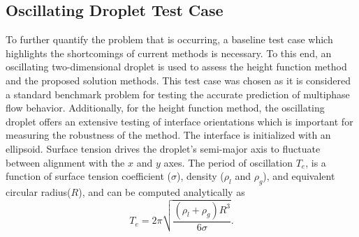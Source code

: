 %

%
%
%

\subsection{Oscillating Droplet Test Case}
To further quantify the problem that is occurring, a baseline test case which highlights the shortcomings of current methods is necessary. To this end, an oscillating two-dimensional droplet is used to assess the height function method and the proposed solution methods. This test case was chosen as it is considered a standard benchmark problem for testing the accurate prediction of multiphase flow behavior\cite{Salih2002}. Additionally, for the height function method, the oscillating droplet offers an extensive testing of interface orientations which is important for measuring the robustness of the method. The interface is initialized with an ellipsoid. Surface tension drives the droplet's semi-major axis to fluctuate between alignment with the $x$ and $y$ axes. The period of oscillation $T_{e}$, is a function of surface tension coefficient ($\sigma$), density ($\rho_l$ and $\rho_g$), and equivalent circular radius($R$), and can be computed analytically as~\cite{Rayleigh}
\begin{equation}
T_{e} = 2 \pi \sqrt{\frac{(\rho_{l}+\rho_{g})R^3}{6\sigma}}.
\label{period}
\end{equation}

